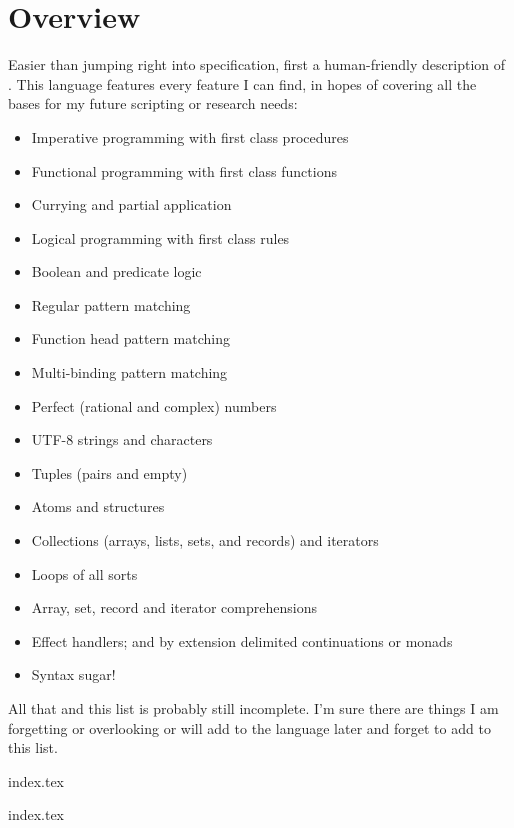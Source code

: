 \section{Overview}

Easier than jumping right into specification, first a human-friendly
description of \Trilogy{}. This language features every feature I can
find, in hopes of covering all the bases for my future scripting or
research needs:

\begin{itemize}
    \item Imperative programming with first class procedures
    \item Functional programming with first class functions
    \item Currying and partial application
    \item Logical programming with first class rules
    \item Boolean and predicate logic
    \item Regular pattern matching
    \item Function head pattern matching
    \item Multi-binding pattern matching
    \item Perfect (rational and complex) numbers
    \item UTF-8 strings and characters
    \item Tuples (pairs and empty)
    \item Atoms and structures
    \item Collections (arrays, lists, sets, and records) and iterators
    \item Loops of all sorts
    \item Array, set, record and iterator comprehensions
    \item Effect handlers; and by extension delimited continuations or monads
    \item Syntax sugar!
\end{itemize}

\noindent
All that and this list is probably still incomplete. I'm sure there are things
I am forgetting or overlooking or will add to the language later and forget to
add to this list.

{index.tex}

{index.tex}

